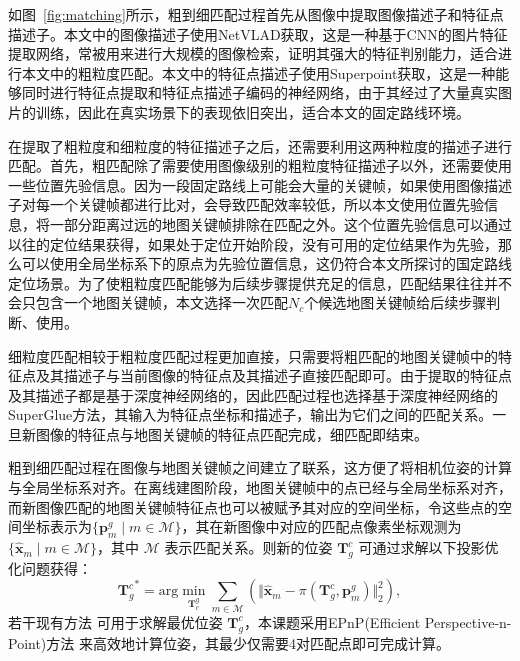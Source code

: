 如图~\ref{fig:matching}所示，粗到细匹配过程首先从图像中提取图像描述子和特征点描述子。本文中的图像描述子使用NetVLAD\cite{arandjelovic2016netvlad}获取，这是一种基于CNN的图片特征提取网络，常被用来进行大规模的图像检索，证明其强大的特征判别能力，适合进行本文中的粗粒度匹配。本文中的特征点描述子使用Superpoint\cite{detone2018superpoint}获取，这是一种能够同时进行特征点提取和特征点描述子编码的神经网络，由于其经过了大量真实图片的训练，因此在真实场景下的表现依旧突出，适合本文的固定路线环境。

在提取了粗粒度和细粒度的特征描述子之后，还需要利用这两种粒度的描述子进行匹配。首先，粗匹配除了需要使用图像级别的粗粒度特征描述子以外，还需要使用一些位置先验信息。因为一段固定路线上可能会大量的关键帧，如果使用图像描述子对每一个关键帧都进行比对，会导致匹配效率较低，所以本文使用位置先验信息，将一部分距离过远的地图关键帧排除在匹配之外。这个位置先验信息可以通过以往的定位结果获得，如果处于定位开始阶段，没有可用的定位结果作为先验，那么可以使用全局坐标系下的原点为先验位置信息，这仍符合本文所探讨的国定路线定位场景。为了使粗粒度匹配能够为后续步骤提供充足的信息，匹配结果往往并不会只包含一个地图关键帧，本文选择一次匹配$N_c$个候选地图关键帧给后续步骤判断、使用。

细粒度匹配相较于粗粒度匹配过程更加直接，只需要将粗匹配的地图关键帧中的特征点及其描述子与当前图像的特征点及其描述子直接匹配即可。由于提取的特征点及其描述子都是基于深度神经网络的，因此匹配过程也选择基于深度神经网络的SuperGlue\cite{sarlin2020superglue}方法，其输入为特征点坐标和描述子，输出为它们之间的匹配关系。一旦新图像的特征点与地图关键帧的特征点匹配完成，细匹配即结束。

粗到细匹配过程在图像与地图关键帧之间建立了联系，这方便了将相机位姿的计算与全局坐标系对齐。在离线建图阶段，地图关键帧中的点已经与全局坐标系对齐，而新图像匹配的地图关键帧特征点也可以被赋予其对应的空间坐标，令这些点的空间坐标表示为$\{\symbf{p}_m^g \mid m \in \mathcal{M}\}$，其在新图像中对应的匹配点像素坐标观测为$\{\hat{\symbf{x}}_m \mid m \in \mathcal{M}\}$，其中 $\mathcal{M}$ 表示匹配关系。则新的位姿 $\symbf{T}^{c}_g$ 可通过求解以下投影优化问题获得：
\begin{equation}
  {\symbf{T}^{c}_g}^* = \text{arg} \min_{\symbf{T}_{c}^g} \sum_{m \in \mathcal{M}} \left( \Vert \hat{\symbf{x}}_m - \pi(\symbf{T}^{c}_g, \symbf{p}_m^g) \Vert^2_2 \right),
\end{equation}
若干现有方法 \cite{lepetit2009ep, gao2003complete} 可用于求解最优位姿 $\symbf{T}^{c}_g$，本课题采用EPnP(Efficient Perspective-n-Point)方法 \cite{lepetit2009ep}来高效地计算位姿，其最少仅需要4对匹配点即可完成计算。

